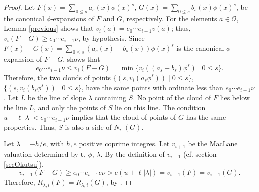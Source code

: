 \documentclass{amsart}
\begin{document}
\begin{proof}
Let $F(x)=\sum_{0\le s}a_s(x)\phi(x)^s$,  $G(x)=\sum_{0\le s}b_s(x)\phi(x)^s$, be the canonical $\phi$-expansions 
of $F$ and $G$, respectively. For the elements $a\in {\mathcal{O}}$, Lemma \ref{previous} shows that $v_i(a)=e_0\cdots e_{i-1}v(a)$; thus, $v_i(F-G)\ge e_0\cdots e_{i-1}\nu$, by hypothesis. Since $F(x)-G(x)=\sum_{0\le s}(a_s(x)-b_s(x))\phi(x)^s$ is the canonical $\phi$-expansion of $F-G$, \cite[Lem. 2.17]{HN} shows that 
$$e_0\cdots e_{i-1}\nu\le v_i(F-G)=\min\{v_i((a_s-b_s)\phi^s)\mid 0\le s\}.
$$Therefore, the two clouds of points $\{(s,v_i(a_s\phi^s))\mid 0\le s\}$, $\{(s,v_i(b_s\phi^s))\mid 0\le s\}$,  
have the same points with ordinate less than $e_0\cdots e_{i-1}\nu$. Let $L$ be the line of slope $\lambda$ containing $S$. No point of the cloud of $F$ lies below the line $L$, and only the points of $S$ lie on this line. The condition  $u+\ell|\lambda|< e_0\cdots e_{i-1}\nu$ implies that the cloud of points of $G$ has the same properties. Thus, $S$ is also a side of $N_i^-(G)$.   

Let $\lambda=-h/e$, with $h,e$ positive coprime integres. Let $v_{i+1}$ be the MacLane valuation determined by  ${\mathbf{t}},\,\phi,\,\lambda$. By the definition of $v_{i+1}$ (cf. section \ref{secOkutsu}),
$$
v_{i+1}(F-G)\ge e_0\cdots e_{i-1}e\nu>e(u+\ell|\lambda|)=v_{i+1}(F)=v_{i+1}(G).
$$ 
Therefore,  $R_{\lambda,i}(F)=R_{\lambda,i}(G)$, by \cite[Prop. 2.8]{HN}. 
\end{proof}
\end{document}
